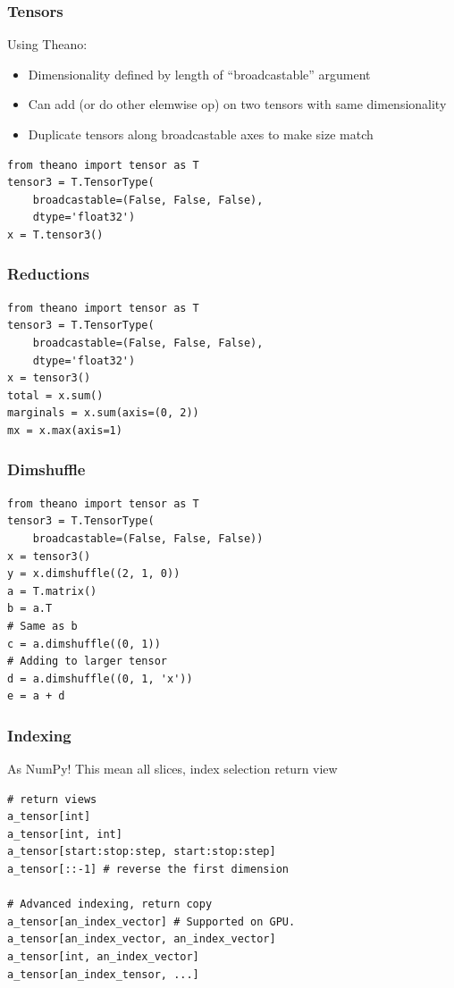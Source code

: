 \documentclass[utf8x,xcolor=pdftex,dvipsnames,table]{beamer}
\begin{document}
\begin{frame}[fragile]
  \frametitle{Tensors}
  Using Theano:
  \begin{itemize}
  \item Dimensionality defined by length of ``broadcastable'' argument
  \item Can add (or do other elemwise op) on two
    tensors with same dimensionality
  \item Duplicate tensors along broadcastable axes to make size match
  \end{itemize}
\begin{lstlisting}
from theano import tensor as T
tensor3 = T.TensorType(
    broadcastable=(False, False, False),
    dtype='float32')
x = T.tensor3()
\end{lstlisting}
\end{frame}

\begin{frame}[fragile]
  \frametitle{Reductions}
\begin{lstlisting}
from theano import tensor as T
tensor3 = T.TensorType(
    broadcastable=(False, False, False),
    dtype='float32')
x = tensor3()
total = x.sum()
marginals = x.sum(axis=(0, 2))
mx = x.max(axis=1)
\end{lstlisting}
\end{frame}

\begin{frame}[fragile]
  \frametitle{Dimshuffle}

\begin{lstlisting}
from theano import tensor as T
tensor3 = T.TensorType(
    broadcastable=(False, False, False))
x = tensor3()
y = x.dimshuffle((2, 1, 0))
a = T.matrix()
b = a.T
# Same as b
c = a.dimshuffle((0, 1))
# Adding to larger tensor
d = a.dimshuffle((0, 1, 'x'))
e = a + d
\end{lstlisting}
\end{frame}

\begin{frame}[fragile]
  \frametitle{Indexing}
  As NumPy!
  This mean all slices, index selection return view
\begin{lstlisting}
# return views
a_tensor[int]
a_tensor[int, int]
a_tensor[start:stop:step, start:stop:step]
a_tensor[::-1] # reverse the first dimension

# Advanced indexing, return copy
a_tensor[an_index_vector] # Supported on GPU.
a_tensor[an_index_vector, an_index_vector]
a_tensor[int, an_index_vector]
a_tensor[an_index_tensor, ...]
\end{lstlisting}
\end{frame}
\end{document}
